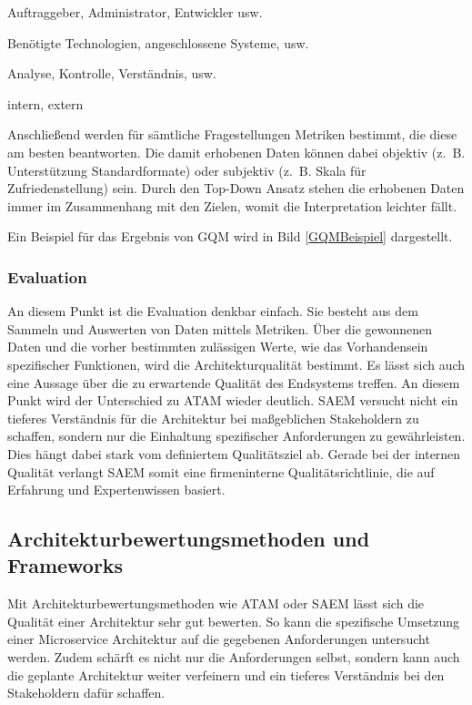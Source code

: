 \begin{description}[leftmargin=!,labelwidth=\widthof{\bfseries Anwendungsbereich}]
	\item[Sichtweise] Auftraggeber, Administrator, Entwickler usw.
	\item[Anwendungsbereich] Benötigte Technologien, angeschlossene Systeme, usw.
	\item[Zweck] Analyse, Kontrolle, Verständnis, usw.
	\item[Kontext] intern, extern
\end{description} 
 
Anschließend werden für sämtliche Fragestellungen Metriken bestimmt, die diese am besten beantworten. Die damit erhobenen Daten können dabei objektiv (z.~B. Unterstützung Standardformate) oder subjektiv (z.~B. Skala für Zufriedenstellung) sein.
Durch den Top-Down Ansatz stehen die erhobenen Daten immer im Zusammenhang mit den Zielen, womit die Interpretation leichter fällt. 

Ein Beispiel für das Ergebnis von \ac{GQM} wird in Bild \ref{GQMBeispiel} dargestellt.

 
\subsubsection{Evaluation}
An diesem Punkt ist die Evaluation denkbar einfach. Sie besteht aus dem Sammeln und Auswerten von Daten mittels Metriken. Über die gewonnenen Daten und die vorher bestimmten zulässigen Werte, wie das Vorhandensein spezifischer Funktionen, wird die Architekturqualität bestimmt. Es lässt sich auch eine Aussage über die zu erwartende Qualität des Endsystems treffen.
An diesem Punkt wird der Unterschied zu \ac{ATAM} wieder deutlich. \ac{SAEM} versucht nicht ein tieferes Verständnis für die Architektur bei maßgeblichen Stakeholdern zu schaffen, sondern nur die Einhaltung spezifischer Anforderungen zu gewährleisten. Dies hängt dabei stark vom definiertem Qualitätsziel ab. Gerade bei der internen Qualität verlangt \ac{SAEM} somit eine firmeninterne Qualitätsrichtlinie\cite{IEEE_TSE2002}, die auf Erfahrung und Expertenwissen basiert.

\subsection{Architekturbewertungsmethoden und Frameworks}
Mit Architekturbewertungsmethoden wie \ac{ATAM} oder \ac{SAEM} lässt sich die Qualität einer Architektur sehr gut bewerten. So kann die spezifische Umsetzung einer Microservice Architektur auf die gegebenen Anforderungen untersucht werden. Zudem schärft es nicht nur die Anforderungen selbst, sondern kann auch die geplante Architektur weiter verfeinern und ein tieferes Verständnis bei den Stakeholdern dafür schaffen.

